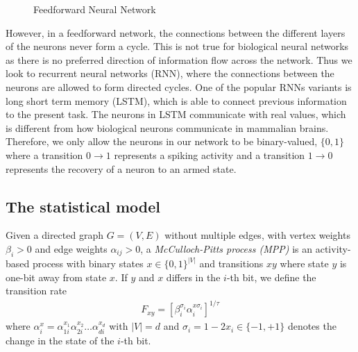 \begin{figure}[h]
\caption{Feedforward Neural Network}
\label{fig:feedforwardnn}
\end{figure}

However, in a feedforward network, the connections between the different layers of the neurons never form a cycle. This is not true for biological neural networks as there is no preferred direction of information flow across the network. Thus we look to recurrent neural networks (RNN), where the connections between the neurons are allowed to form directed cycles. One of the popular RNNs variants is long short term memory (LSTM), which is able to connect previous information to the present task. The neurons in LSTM communicate with real values, which is different from how biological neurons communicate in mammalian brains. Therefore, we only allow the neurons in our network to be binary-valued, $\{0,1\}$ where a transition $0 \to 1$ represents a spiking activity and a transition $1 \to 0$ represents the recovery of a neuron to an armed state.


\subsection*{The statistical model}

Given a directed graph $G=(V,E)$ without multiple edges, with vertex weights $\beta_i > 0$ and edge weights $\alpha_{ij} > 0$, a \emph{McCulloch-Pitts process (MPP)} is an activity-based process with binary states $x \in \{0,1\}^{|V|}$ and transitions $xy$ where state $y$ is one-bit away from state $x$. If $y$ and $x$ differs in the $i$-th bit, we define the transition rate
\begin{align*}
F_{xy} = \left[ \beta_i^{\sigma_i} \alpha_i^{x \sigma_i} \right]^{1/\tau}
\end{align*}
where $\alpha_i^{x} = \alpha_{1i}^{x_1}\alpha_{2i}^{x_2}\ldots\alpha_{di}^{x_{d}}$ with $|V|=d$ and $\sigma_i = 1 - 2x_i \in \{-1,+1\}$ denotes the change in the state of the $i$-th bit.


